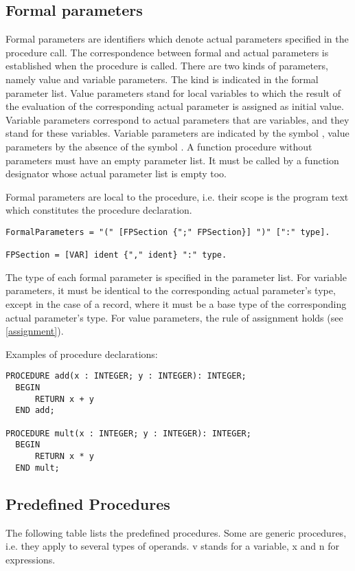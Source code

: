 \documentclass[12pt]{article}
\begin{document}
\subsection{Formal parameters}
\label{parameters}

Formal parameters are identifiers which denote actual parameters specified in the procedure call. The correspondence between formal and actual parameters is established when the procedure is called. There are two kinds of parameters, namely value and variable parameters. The kind is indicated in the formal parameter list. Value parameters stand for local variables to which the result of the evaluation of the corresponding actual parameter is assigned as initial value. Variable parameters correspond to actual parameters that are variables, and they stand for these variables. Variable parameters are indicated by the symbol \VAR, value parameters by the absence of the symbol \VAR. A function procedure without parameters must have an empty parameter list. It must be called by a function designator whose actual parameter list is empty too.

Formal parameters are local to the procedure, i.e. their scope is the program text which constitutes the procedure declaration.

\begin{lstlisting}[style=ebnf]
FormalParameters = "(" [FPSection {";" FPSection}] ")" [":" type]. 

FPSection = [VAR] ident {"," ident} ":" type.
\end{lstlisting} 

The type of each formal parameter is specified in the parameter list. For variable parameters, it must be identical to the corresponding actual parameter's type, except in the case of a record, where it must be a base type of the corresponding actual parameter's type. For value parameters, the rule of assignment holds (see \ref{assignment}).

Examples of procedure declarations:

\begin{lstlisting}[style=example]
PROCEDURE add(x : INTEGER; y : INTEGER): INTEGER;
  BEGIN
      RETURN x + y
  END add;

PROCEDURE mult(x : INTEGER; y : INTEGER): INTEGER;
  BEGIN
      RETURN x * y
  END mult;
\end{lstlisting} 

\subsection{Predefined Procedures}
\label{predefined}
The following table lists the predefined procedures. Some are generic procedures, i.e. they apply to several types of operands. v stands for a variable, x and n for expressions.
\end{document}
